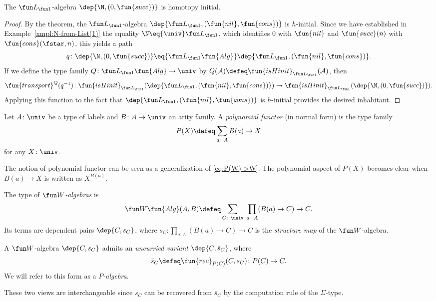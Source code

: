 \begin{cor}
    The $\fun L_{\fun1}$-algebra $\dep{\N,(0, \fun{succ})}$ is homotopy initial.
\end{cor}

\begin{proof}
    By the theorem, the $\fun L_{\fun1}$-algebra $\dep{\fun L_{\fun1},(\fun{nil}, \fun{cons})}$ is $h$-initial. Since we have established in Example~\ref{xmpl:N-from-List(1)} the equality $\N\eq{\univ}\fun L_{\fun1}$, which identifies $0$ with $\fun{nil}$ and $\fun{succ}(n)$ with $\fun{cons}(\fstar,n)$, this yields a path
    \[
        q\colon
        \dep{\N,(0,\fun{succ})}
        \eq{\fun L_{\fun1}\fun{Alg}}
        \dep{\fun L_{\fun1},(\fun{nil},\fun{cons})}.
    \]
    If we define the type family $Q\colon\fun L_{\fun1}\fun{Alg}\to\univ$ by $Q(\mathcal{A})\defeq\fun{isHinit}_{\fun L_{\fun1}}(\mathcal{A})$, then
    \[
        \fun{transport}^Q(q^{-1}) \colon 
        \fun{isHinit}_{\fun L_{\fun1}}(\dep{\fun L_{\fun1},(\fun{nil},\fun{cons})}) 
        \to 
        \fun{isHinit}_{\fun L_{\fun1}}(\dep{\N,(0,\fun{succ})}).
    \]
    Applying this function to the fact that $\dep{\fun L_{\fun1},(\fun{nil},\fun{cons})}$ is $h$-initial provides the desired inhabitant.
\end{proof}

\begin{defn}
    Let $A\colon\univ$ be a type of labels and $B\colon A\to\univ$ an arity family. A \textsl{polynomial functor} (in normal form) is the type family
    \[
        P(X)\defeq\sum_{a\colon A}B(a)\to X
    \]
    for any $X\colon\univ$.
\end{defn}

\begin{rem}
    The notion of polynomial functor can be seen as a generalization of \eqref{eq:P(W)->W}. The polynomial aspect of $P(X)$ becomes clear when $B(a)\to X$ is written as $X^{B(a)}$.
\end{rem}

\begin{defn} 
    The type of \textsl{$\fun W$-algebras} is
    \[
        \fun W\fun{Alg}(A,B)
            \defeq\sum_{C\colon\univ}\;
                \prod_{a\colon A}(B(a)\to C)\to C.
    \]
    Its terms are dependent pairs $\dep{C,s_C}$, where $s_C\colon\prod_{a\colon A}(B(a)\to C)\to C$ is the \textsl{structure map} of the $\fun W$-algebra.
\end{defn}

\begin{rem}
    A $\fun W$-algebra $\dep{C,s_C}$ admits an \textsl{uncurried variant} $\dep{C,\bar{s}_C}$, where
    \[
        \bar{s}_C\defeq\fun{rec}_{P(C)}(C,s_C)
            \colon P(C)\to C.
    \]
    We will refer to this form as a \textsl{$P$-algebra}.
    
    These two views are interchangeable since $s_C$ can be recovered from $\bar{s}_C$ by the computation rule of the $\Sigma$-type.
\end{rem}

